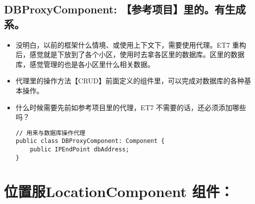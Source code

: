 \documentclass[9pt, b5paper]{article}
\begin{document}
\subsection{DBProxyComponent: 【参考项目】里的。有生成系。}
\label{sec-4-6}
\begin{itemize}
\item 没明白，以前的框架什么情境、或使用上下文下，需要使用代理。ET7 重构后，感觉就是下放到了各个小区，使用时去拿各区里的数据库。区里的数据库，感觉管理的也是各小区里什么相关数据。
\item 代理里的操作方法【CRUD】前面定义的组件里，可以完成对数据库的各种基本操作。
\item 什么时候需要先前如参考项目里的代理，ET7 不需要的话，还必须添加哪些吗？
\begin{verbatim}
// 用来与数据库操作代理
public class DBProxyComponent: Component {
    public IPEndPoint dbAddress;
}
\end{verbatim}
\end{itemize}


\section{位置服LocationComponent 组件：}
\label{sec-5}
\end{document}
